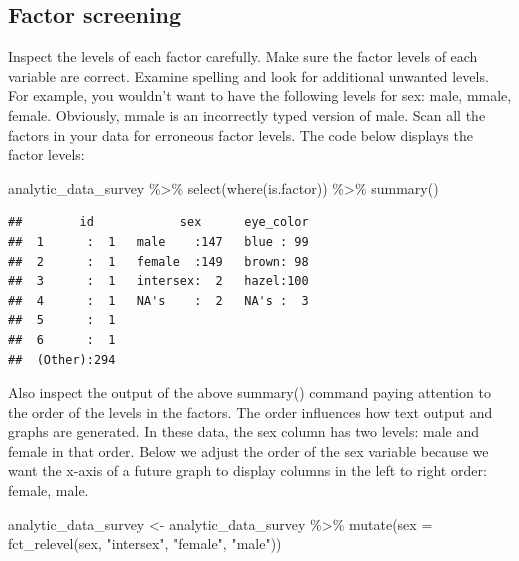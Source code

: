 \documentclass[
]{krantz}
\makeatletter
\newenvironment{Shaded}{\begin{snugshade}}{\end{snugshade}}
\newcommand{\AttributeTok}[1]{\textcolor[rgb]{0.61,0.61,0.61}{#1}}
\newcommand{\FunctionTok}[1]{\textcolor[rgb]{0,0,0}{#1}}
\newcommand{\NormalTok}[1]{#1}
\newcommand{\OtherTok}[1]{\textcolor[rgb]{0.37,0.37,0.37}{#1}}
\newcommand{\SpecialCharTok}[1]{\textcolor[rgb]{0,0,0}{#1}}
\newcommand{\StringTok}[1]{\textcolor[rgb]{0.5,0.5,0.5}{#1}}
\newenvironment{kframe}{%
\medskip{}
\setlength{\fboxsep}{.8em}
 \def\at@end@of@kframe{}%
 \ifinner\ifhmode%
  \def\at@end@of@kframe{\end{minipage}}%
  \begin{minipage}{\columnwidth}%
 \fi\fi%
 \def\FrameCommand##1{\hskip\@totalleftmargin \hskip-\fboxsep
 \colorbox{shadecolor}{##1}\hskip-\fboxsep
     \hskip-\linewidth \hskip-\@totalleftmargin \hskip\columnwidth}%
 \MakeFramed {\advance\hsize-\width
   \@totalleftmargin\z@ \linewidth\hsize
   \@setminipage}}%
 {\par\unskip\endMakeFramed%
 \at@end@of@kframe}
\renewenvironment{Shaded}{\begin{kframe}}{\end{kframe}}
\makeatother
\begin{document}
\hypertarget{factor-screening}{%
\subsection{Factor screening}\label{factor-screening}}

Inspect the levels of each factor carefully. Make sure the factor levels of each variable are correct. Examine spelling and look for additional unwanted levels. For example, you wouldn't want to have the following levels for sex: male, mmale, female. Obviously, mmale is an incorrectly typed version of male. Scan all the factors in your data for erroneous factor levels. The code below displays the factor levels:

\begin{Shaded}
\begin{Highlighting}[]
\NormalTok{analytic\_data\_survey }\SpecialCharTok{\%\textgreater{}\%}
  \FunctionTok{select}\NormalTok{(}\FunctionTok{where}\NormalTok{(is.factor)) }\SpecialCharTok{\%\textgreater{}\%}
  \FunctionTok{summary}\NormalTok{()}
\end{Highlighting}
\end{Shaded}

\begin{verbatim}
##        id            sex      eye_color  
##  1      :  1   male    :147   blue : 99  
##  2      :  1   female  :149   brown: 98  
##  3      :  1   intersex:  2   hazel:100  
##  4      :  1   NA's    :  2   NA's :  3  
##  5      :  1                             
##  6      :  1                             
##  (Other):294
\end{verbatim}

Also inspect the output of the above summary() command paying attention to the order of the levels in the factors. The order influences how text output and graphs are generated. In these data, the sex column has two levels: male and female in that order. Below we adjust the order of the sex variable because we want the x-axis of a future graph to display columns in the left to right order: female, male.

\begin{Shaded}
\begin{Highlighting}[]
\NormalTok{analytic\_data\_survey }\OtherTok{\textless{}{-}}\NormalTok{ analytic\_data\_survey }\SpecialCharTok{\%\textgreater{}\%}
  \FunctionTok{mutate}\NormalTok{(}\AttributeTok{sex =} \FunctionTok{fct\_relevel}\NormalTok{(sex,}
                           \StringTok{"intersex"}\NormalTok{,}
                           \StringTok{"female"}\NormalTok{,}
                           \StringTok{"male"}\NormalTok{))}
\end{Highlighting}
\end{Shaded}
\end{document}
